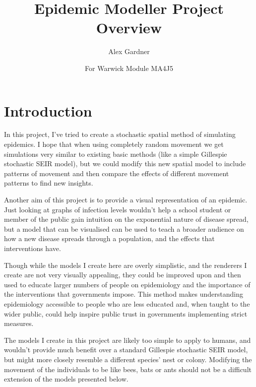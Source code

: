 \documentclass[11pt]{article}
\begin{document}
\title{Epidemic Modeller Project Overview}
\author{Alex Gardner}
\date{For Warwick Module MA4J5}
\maketitle
\tableofcontents
\newpage
\section{Introduction}
In this project, I've tried to create a stochastic spatial method of simulating epidemics. I hope that when using completely random movement we get simulations very similar to existing basic methods (like a simple Gillespie stochastic SEIR model), but we could modify this new spatial model to include patterns of movement and then compare the effects of different movement patterns to find new insights.

Another aim of this project is to provide a visual representation of an epidemic. Just looking at graphs of infection levels wouldn't help a school student or member of the public gain intuition on the exponential nature of disease spread, but a model that can be visualised can be used to teach a broader audience on how a new disease spreads through a population, and the effects that interventions have.

Though while the models I create here are overly simplistic, and the renderers I create are not very visually appealing, they could be improved upon and then used to educate larger numbers of people on epidemiology and the importance of the interventions that governments impose. This method makes understanding epidemiology accessible to people who are less educated and, when taught to the wider public, could help inspire public trust in governments implementing strict measures.

The models I create in this project are likely too simple to apply to humans, and wouldn't provide much benefit over a standard Gillespie stochastic SEIR model, but might more closely resemble a different species' nest or colony. Modifying the movement of the individuals to be like bees, bats or ants should not be a difficult extension of the models presented below.
\end{document}
